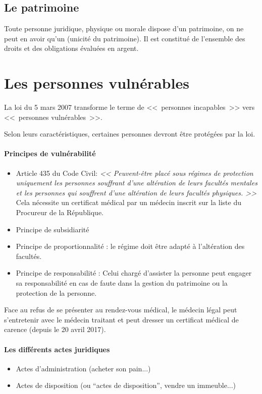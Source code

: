 \documentclass[10pt,a4paper]{article}
\begin{document}
\subsection{Le patrimoine}

Toute personne juridique, physique ou morale dispose d'un patrimoine, on ne peut en avoir qu'un (unicité du patrimoine). Il est constitué de l'ensemble des droits et des obligations évaluées en argent.

\section{Les personnes vulnérables}

La loi du 5 mars 2007 transforme le terme de <<~personnes incapables~>> vers <<~personnes vulnérables~>>.

Selon leurs caractéristiques, certaines personnes devront être protégées par la loi.

\paragraph{Principes de vulnérabilité}

\begin{itemize}
\item Article 435 du Code Civil: \textit{<< Peuvent-être placé sous régimes de protection uniquement les personnes souffrant d'une altération de leurs facultés mentales et les personnes qui souffrent d'une altération de leurs facultés physiques. >>} Cela nécessite un certificat médical par un médecin inscrit sur la liste du Procureur de la République.
\item Principe de subsidiarité
\item Principe de proportionnalité : le régime doit être adapté à l'altération des facultés.
\item Principe de responsabilité : Celui chargé d'assister la personne peut engager sa responsabilité en cas de faute dans la gestion du patrimoine ou la protection de la personne.
\end{itemize}

Face au refus de se présenter au rendez-vous médical, le médecin légal peut s'entretenir avec le médecin traitant et peut dresser un certificat médical de carence (depuis le 20 avril 2017).

\paragraph{Les différents actes juridiques}
\begin{itemize}
\item Actes d'administration (acheter son pain...)
\item Actes de disposition (ou ``actes de disposition'', vendre un immeuble...)
\end{itemize}
\end{document}
